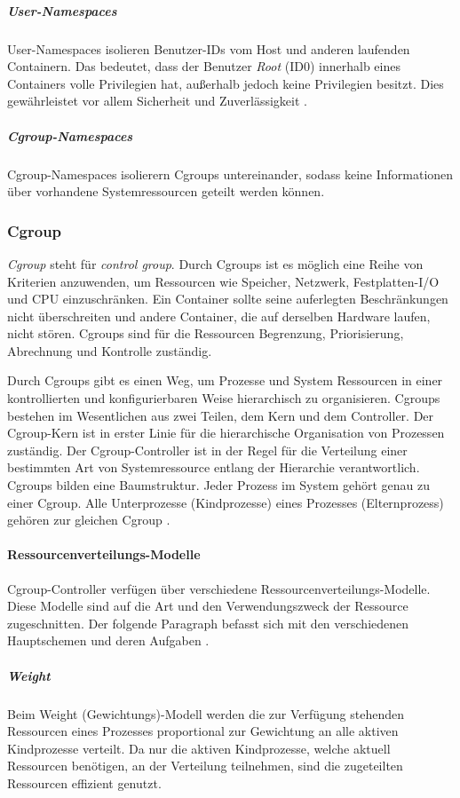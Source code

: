 \subparagraph{User-Namespaces} User-Namespaces isolieren Benutzer-IDs vom Host und anderen laufenden Containern. Das bedeutet, dass der Benutzer \emph{Root} (ID0) innerhalb eines Containers volle Privilegien hat, außerhalb jedoch keine Privilegien besitzt. Dies gewährleistet vor allem Sicherheit und Zuverlässigkeit \cite{Xavier2015AClouds}.

\subparagraph{Cgroup-Namespaces} Cgroup-Namespaces isolierern Cgroups untereinander, sodass keine Informationen über vorhandene Systemressourcen geteilt werden können.



\subsubsection{Cgroup}
\emph{Cgroup} steht für \emph{control group}. Durch Cgroups ist es möglich eine Reihe von Kriterien anzuwenden, um Ressourcen wie Speicher, Netzwerk, Festplatten-I/O und CPU einzuschränken. Ein Container sollte seine auferlegten Beschränkungen nicht überschreiten und andere Container, die auf derselben Hardware laufen, nicht stören. Cgroups sind für die Ressourcen Begrenzung, Priorisierung, Abrechnung und Kontrolle zuständig.

Durch Cgroups gibt es einen Weg, um Prozesse und System Ressourcen in einer kontrollierten und konfigurierbaren Weise hierarchisch zu organisieren. Cgroups bestehen im Wesentlichen aus zwei Teilen, dem Kern und dem Controller. Der Cgroup-Kern ist in erster Linie für die hierarchische Organisation von Prozessen zuständig. Der Cgroup-Controller ist in der Regel für die Verteilung einer bestimmten Art von Systemressource entlang der Hierarchie verantwortlich. Cgroups bilden eine Baumstruktur. Jeder Prozess im System gehört genau zu einer Cgroup. Alle Unterprozesse (Kindprozesse) eines Prozesses (Elternprozess) gehören zur gleichen Cgroup \cite{Heo2015ControlV2}. 


\paragraph{Ressourcenverteilungs-Modelle}
Cgroup-Controller verfügen über verschiedene Ressourcenverteilungs-Modelle. Diese Modelle sind auf die Art und den Verwendungszweck der Ressource zugeschnitten. Der folgende Paragraph befasst sich mit den verschiedenen Hauptschemen und deren Aufgaben \cite{Heo2015ControlV2}.

\subparagraph{Weight}
Beim Weight (Gewichtungs)-Modell werden die zur Verfügung stehenden Ressourcen eines Prozesses proportional zur Gewichtung an alle aktiven Kindprozesse verteilt. Da nur die aktiven Kindprozesse, welche aktuell Ressourcen benötigen, an der Verteilung teilnehmen, sind die zugeteilten Ressourcen effizient genutzt. 

